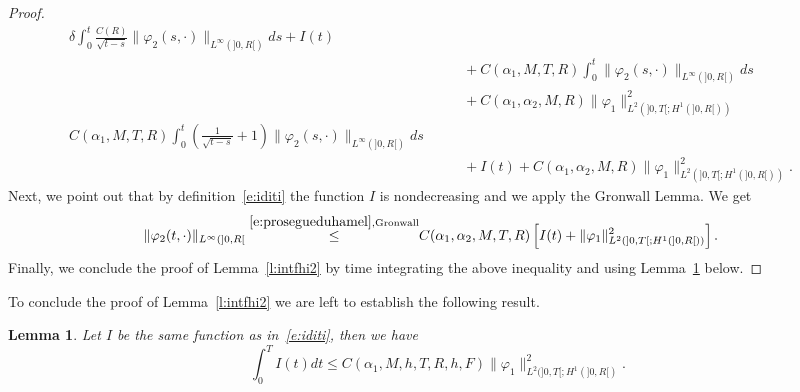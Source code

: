\documentclass[11pt,leqno]{amsart}
\newtheorem{lemma}[theorem]{Lemma}
\numberwithin{equation}{section}
\begin{document}
\begin{proof}
\begin{equation}
\begin{split}
  \delta 
   \int_0^t \frac{C(R)}{\sqrt{t-s}}  \| {\varphi}_2 (s, \cdot) \|_{L^\infty (]0, R[)} ds +
   I(t)\\
   & \qquad 
   + C(\alpha_1, M, T, R) \int_0^t  
   \| {\varphi}_2 (s, \cdot) \|_{L^\infty (]0, R[)} ds    \\
   & \qquad 
   + C(\alpha_1, \alpha_2, M, R)  
   \| {\varphi}_1  \|^2_{L^2 (]0, T[; H^1 (]0, R[))} \\
   
    C(\alpha_1, M, T, R)
   \int_0^t \left( \frac{1}{\sqrt{t-s}}+1 \right)
     \| {\varphi}_2 (s, \cdot) \|_{L^\infty (]0, R[)} ds \\
     & \qquad +
   I(t)   + C(\alpha_1, \alpha_2, M, R)  
   \| {\varphi}_1  \|^2_{L^2 (]0, T[; H^1 (]0, R[))} 
   . \phantom{\int}
\end{split}
\end{equation} 
Next, we point out that by definition~\eqref{e:iditi} the function $I$ is nondecreasing and we apply the Gronwall Lemma.
We get 
\begin{equation*}
\begin{split}
        \| {\varphi}_2 (t, \cdot) \|_{L^\infty (]0, R[} \stackrel{\eqref{e:prosegueduhamel}, \text{Gronwall}}{\leq} & 
         C(\alpha_1, \alpha_2, M, T, R)  \left[  I (t) + 
         \| {\varphi}_1  \|^2_{L^2 (]0, T[; H^1 (]0, R[))} \right]. 
\end{split}  
\end{equation*}
Finally, we conclude the proof of Lemma~\ref{l:intfhi2} by time integrating the above inequality and  
using Lemma~\ref{l:iditi} below. 
\end{proof}
To conclude the proof of Lemma~\ref{l:intfhi2} we are left to establish the following result. 
\begin{lemma}
\label{l:iditi}
Let $I$ be the same function as in~\eqref{e:iditi}, then we have 
\begin{equation}
\label{e:controli}
   \int_0^T  I (t) 
   dt  \leq C(\alpha_1, M, h, T, R, h, F)
   \| {\varphi}_1 \|^2_{L^2 (]0, T[; H^1 (]0, R[)}. 
\end{equation}
\end{lemma}
\end{document}
